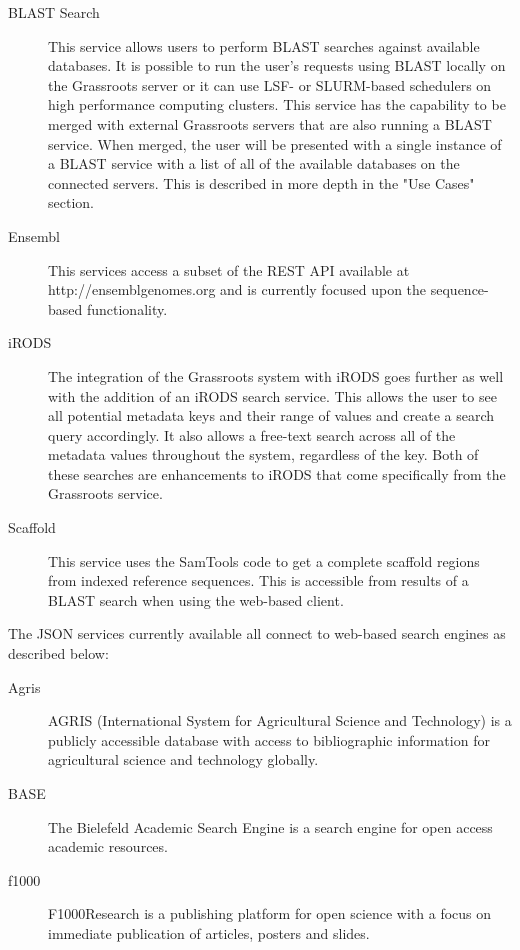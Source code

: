 \documentclass[9pt,a4paper]{extarticle}
\begin{document}
\begin{description}

\item [BLAST Search] This service allows users to perform BLAST searches against available databases.
It is possible to run the user's requests using BLAST locally on the Grassroots server or it can use LSF-\cite{lsf} or SLURM-based\cite{yoo2003slurm} schedulers on high performance computing clusters. 
This service has the capability to be merged with external Grassroots servers that are
also running a BLAST service. When merged, the user will be presented with a single instance of a BLAST
service with a list of all of the available databases on the connected servers. This is described in more depth in the "Use Cases" section. 


\item [Ensembl] This services access a subset of the REST API available at http://ensemblgenomes.org\cite{kersey2016ensembl} and is currently focused upon the sequence-based functionality.

\item [iRODS] The integration of the Grassroots system with iRODS goes further as well with the addition of an iRODS search service. 
This allows the user to see all potential metadata keys and their range of values and create a search query accordingly.
It also allows a free-text search across all of the metadata values throughout the system, regardless of the key. 
Both of these searches are enhancements to iRODS that come specifically from the Grassroots service.

\item [Scaffold] This service uses the SamTools\cite{li2009sequence} code to get a complete scaffold regions from indexed reference sequences. This is accessible from results of a BLAST search when using the web-based client.



\end{description}

The JSON services currently available all connect to web-based search engines as described below:

\begin{description}
\item [Agris] AGRIS\cite{Agris} (International System for Agricultural Science and Technology) is a publicly accessible database with access to bibliographic information for agricultural science and technology globally.
\item [BASE] The Bielefeld Academic Search Engine\cite{Pieper2015} is a search engine for open access academic resources.
\item [f1000] F1000Research\cite{f1000} is a publishing platform for open science with a focus on immediate publication of articles, posters and slides.
\end{description}
\end{document}
